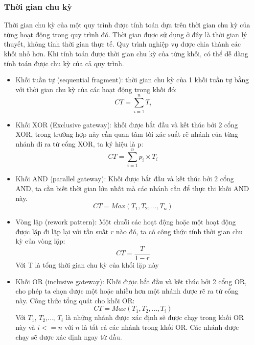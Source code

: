 \subsubsection{Thời gian chu kỳ}
Thời gian chu kỳ của một quy trình được tính toán dựa trên thời gian chu kỳ của từng hoạt động trong quy trình đó. Thời gian được sử dụng ở đây là thời gian lý thuyết, không tính thời gian thực tế.
Quy trình nghiệp vụ được chia thành các khối nhỏ hơn. Khi tính toán được thời gian chu kỳ của từng khối, có thể dễ dàng tính toán được chu kỳ của cả quy trình.
\begin{itemize}
    \item Khối tuần tự (sequential fragment): thời gian chu kỳ của 1 khối tuần tự bằng với thời gian chu kỳ của các hoạt động trong khối đó:
 \[ CT =\sum_{i=1}^{n} T_i \]
   \item Khối XOR (Exclusive gateway): khối được bắt đầu và kết thúc bởi 2 cổng XOR, trong trường hợp này cần quan tâm tới xác suất rẽ nhánh của từng nhánh đi ra từ cổng XOR, ta ký hiệu là p:
   \[ CT =\sum_{i=1}^{n} p_i \times T_i \]
   \item Khối AND (parallel gateway): Khối được bắt đầu và kết thúc bởi 2 cổng AND, ta cần biết thời gian lớn nhất mà các nhánh cần để thực thi khối AND này.
   \[ CT = Max(T_1, T_2,..., T_n) \]
   \item Vòng lặp (rework pattern): Một chuỗi các hoạt động hoặc một hoạt động được lặp đi lặp lại với tần suất $r$ nào đó, ta có công thức tính thời gian chu kỳ của vòng lặp:
   \[ CT = \frac{T}{1 - r}\]
   Với T là tổng thời gian chu kỳ của khối lặp này
   \item Khối OR (inclusive gateway): Khối được bắt đầu và kết thúc bởi 2 cổng OR, cho phép ta chọn được một hoặc nhiều hơn một nhánh được rẽ ra từ cổng này. Công thức tổng quát cho khối OR:
   \[ CT = Max(T_1, T_2,..., T_i)\]
   Với $T_1$, $T_2$,..., $T_i$ là những nhánh được xác định sẽ được chạy trong khối OR này và $i <= n$ với $n$ là tất cả các nhánh trong khối OR. Các nhánh được chạy sẽ được xác định ngay từ đầu.
\end{itemize}